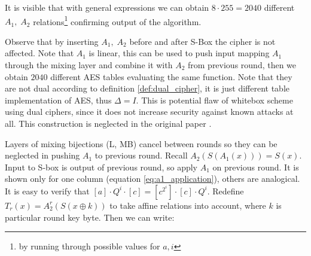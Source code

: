 \documentclass[11pt,oneside,final]{fithesis2}
\begin{document}
	It is visible that with general expressions we can obtain $8 \cdot 255 = 2040$ different 
	$A_1,\;A_2$ relations\footnote{by running through possible values for $a,i$ } confirming output of the algorithm. 
	
	Observe that by inserting $A_1,\;A_2$ before and after S-Box the cipher is not affected. Note that $A_1$ is linear, this can be used to 
	push input mapping $A_1$ through the mixing layer and combine it with $A_2$ from previous round, then we obtain $2040$ different AES 
	tables evaluating the same function. Note that they are not dual according to definition \ref{def:dual_cipher}, it is just different 
	table implementation of AES, thus $\Delta = I$. This is potential flaw of whitebox scheme using dual ciphers, since it does not increase
	security against known attacks at all. This construction is neglected in the original paper \citep{Karroumi:2010:PWA:2041036.2041060}.
	
	Layers of mixing bijections (L, MB) cancel between rounds so they can be neglected in pushing $A_1$ to previous round. 
	Recall $A_2\left(S\left(A_1\left(x\right)\right)\right) = S(x)$. Input to S-box is output of previous round, so apply $A_1$ on previous round.
	It is shown only for one column (equation \ref{eq:a1_application}), others are analogical. It is easy to verify that 
	$\left[a\right] \cdot Q^i \cdot \left[c\right] = \left[c^{2^{i}}\right] \cdot \left[c\right] \cdot Q^i$. 
	Redefine $T_r(x) = A_2^r(S(x \oplus k))$ to take affine relations into account, where $k$ is particular round key byte. Then we can write:

	
\end{document}

